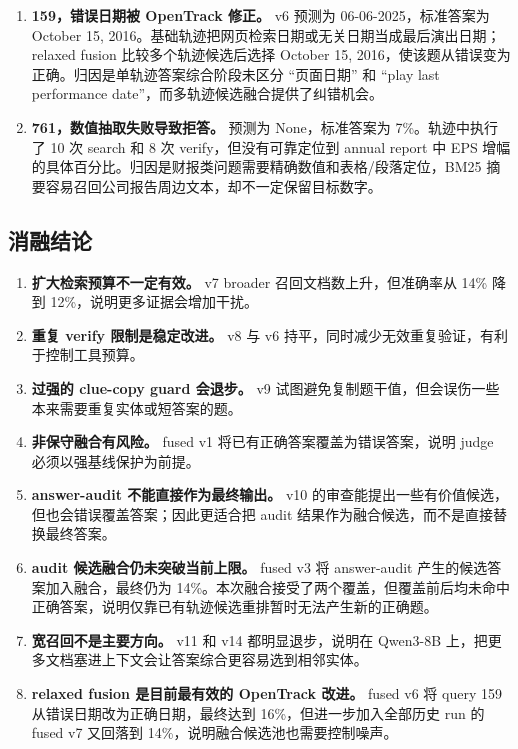 \documentclass[a4paper]{article}
\begin{document}
\begin{enumerate}
  \item \textbf{159，错误日期被 OpenTrack 修正。} v6 预测为 06-06-2025，标准答案为 October 15, 2016。基础轨迹把网页检索日期或无关日期当成最后演出日期；relaxed fusion 比较多个轨迹候选后选择 October 15, 2016，使该题从错误变为正确。归因是单轨迹答案综合阶段未区分 ``页面日期'' 和 ``play last performance date''，而多轨迹候选融合提供了纠错机会。
  \item \textbf{761，数值抽取失败导致拒答。} 预测为 None，标准答案为 7\%。轨迹中执行了 10 次 search 和 8 次 verify，但没有可靠定位到 annual report 中 EPS 增幅的具体百分比。归因是财报类问题需要精确数值和表格/段落定位，BM25 摘要容易召回公司报告周边文本，却不一定保留目标数字。
\end{enumerate}

\subsection{消融结论}

\begin{enumerate}
  \item \textbf{扩大检索预算不一定有效。} v7 broader 召回文档数上升，但准确率从 14\% 降到 12\%，说明更多证据会增加干扰。
  \item \textbf{重复 verify 限制是稳定改进。} v8 与 v6 持平，同时减少无效重复验证，有利于控制工具预算。
  \item \textbf{过强的 clue-copy guard 会退步。} v9 试图避免复制题干值，但会误伤一些本来需要重复实体或短答案的题。
  \item \textbf{非保守融合有风险。} fused v1 将已有正确答案覆盖为错误答案，说明 judge 必须以强基线保护为前提。
  \item \textbf{answer-audit 不能直接作为最终输出。} v10 的审查能提出一些有价值候选，但也会错误覆盖答案；因此更适合把 audit 结果作为融合候选，而不是直接替换最终答案。
  \item \textbf{audit 候选融合仍未突破当前上限。} fused v3 将 answer-audit 产生的候选答案加入融合，最终仍为 14\%。本次融合接受了两个覆盖，但覆盖前后均未命中正确答案，说明仅靠已有轨迹候选重排暂时无法产生新的正确题。
  \item \textbf{宽召回不是主要方向。} v11 和 v14 都明显退步，说明在 Qwen3-8B 上，把更多文档塞进上下文会让答案综合更容易选到相邻实体。
  \item \textbf{relaxed fusion 是目前最有效的 OpenTrack 改进。} fused v6 将 query 159 从错误日期改为正确日期，最终达到 16\%，但进一步加入全部历史 run 的 fused v7 又回落到 14\%，说明融合候选池也需要控制噪声。
\end{enumerate}
\end{document}
